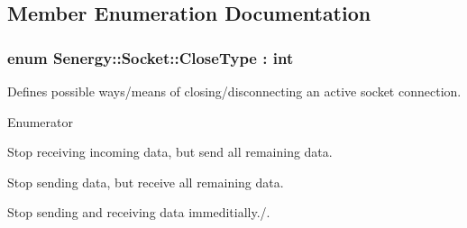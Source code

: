\subsection{Member Enumeration Documentation}
\hypertarget{class_senergy_1_1_socket_a88ed1eb1a5c47ea1b395715aabd37ab4}{
\subsubsection[{Close\-Type}]{\setlength{\rightskip}{0pt plus 5cm}enum {\bf Senergy\-::\-Socket\-::\-Close\-Type} \-: int\hspace{0.3cm}{\ttfamily [strong]}}}\label{class_senergy_1_1_socket_a88ed1eb1a5c47ea1b395715aabd37ab4}


Defines possible ways/means of closing/disconnecting an active socket connection. 

\begin{Desc}
\item[Enumerator]\par
\begin{description}
\item[{\em 
\hypertarget{class_senergy_1_1_socket_a88ed1eb1a5c47ea1b395715aabd37ab4a1851aea8452370ffbc6364027d018da9}{Stop\-Receiving}\label{class_senergy_1_1_socket_a88ed1eb1a5c47ea1b395715aabd37ab4a1851aea8452370ffbc6364027d018da9}
}]Stop receiving incoming data, but send all remaining data. \item[{\em 
\hypertarget{class_senergy_1_1_socket_a88ed1eb1a5c47ea1b395715aabd37ab4a948c383a847087d69042e091d164380b}{Stop\-Sending}\label{class_senergy_1_1_socket_a88ed1eb1a5c47ea1b395715aabd37ab4a948c383a847087d69042e091d164380b}
}]Stop sending data, but receive all remaining data. \item[{\em 
\hypertarget{class_senergy_1_1_socket_a88ed1eb1a5c47ea1b395715aabd37ab4a40b522922220c34afd8e1d4a3ba02208}{Stop\-All}\label{class_senergy_1_1_socket_a88ed1eb1a5c47ea1b395715aabd37ab4a40b522922220c34afd8e1d4a3ba02208}
}]Stop sending and receiving data immeditially./. \end{description}
\end{Desc}



